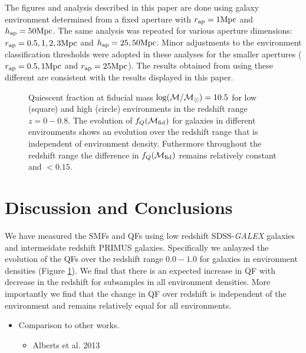 \documentclass{emulateapj}
\begin{document}
The figures and analysis described in this paper are done using galaxy environment determined from a fixed aperture with $r_{\rm{ap}} = 1 \rm{Mpc}$ and $h_{\rm{ap}} = 50 \rm{Mpc}$.
The same analysis was repeated for various aperture dimensions: $r_{\rm{ap}} = 0.5, 1, 2, 3 \rm{Mpc}$ and $h_{\rm{ap}} = 25, 50 \rm{Mpc}$. 
Minor adjustments to the environment classification thresholds were adopted in these analyses for the smaller apertures ($r_{\rm{ap}} = 0.5, 1 \rm{Mpc}$ and $r_{\rm{ap}} = 25 \rm{Mpc}$).
The results obtained from using these different are consistent with the results displayed in this paper. 
\begin{figure}
    \begin{center}
        \leavevmode
        \label{fig:qf}
        \caption{Quiescent fraction at fiducial mass $\rm{log} (\mathcal{M}/\mathcal{M}_{\odot}) = 10.5$ for 
low (square) and high (circle) environments in the redshift range $z = 0 - 0.8$. The evolution of 
$f_{Q}(\mathcal{M}_{\rm{fid}})$ for galaxies in different environments shows an evolution over the redshift
range that is independent of environment density. Futhermore throughout the redshift range the difference in 
$f_{Q}(\mathcal{M}_{\rm{fid}})$ remains relatively constant and $ < 0.15$.}
    \end{center}
\end{figure}

\section{Discussion and Conclusions}
We have measured the SMFs and QFs using low redshift SDSS-{\em GALEX} galaxies and intermeidate redshift PRIMUS galaxies. 
Specifically we anlayzed the evolution of the QFs over the redshift range $0.0-1.0$ for galaxies in environment densities (Figure \ref{fig:qf}). 
We find that there is an expected increase in QF with decrease in the redshift for subsamples in all environment densities.
More importantly we find that the change in QF over redshift is independent of the environment and remains relatively equal for all environments. 

\begin{itemize}
    \item Comparison to other works. 
    \begin{itemize}
        \item Alberts et al. 2013 
    \end{itemize}
\end{itemize}
\end{document}
